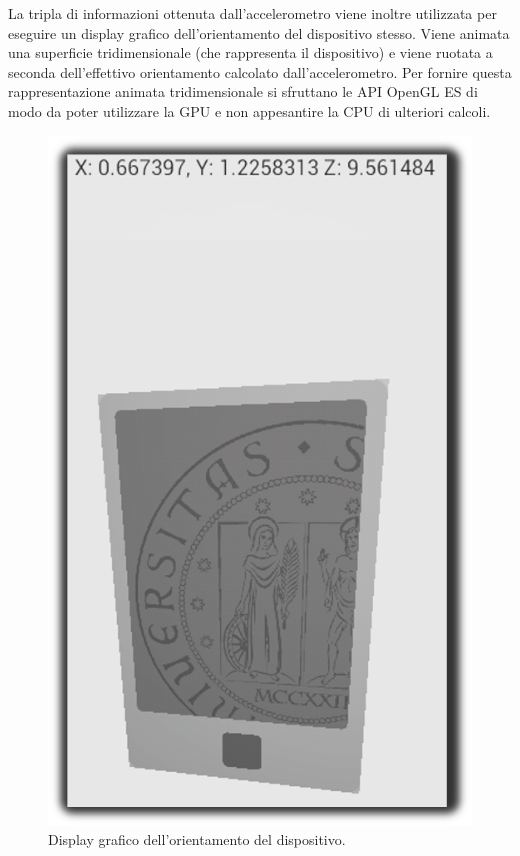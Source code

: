 La tripla di informazioni ottenuta dall'accelerometro viene inoltre utilizzata per eseguire un display grafico dell'orientamento del dispositivo stesso. Viene animata una superficie tridimensionale (che rappresenta il dispositivo) e viene ruotata a seconda dell'effettivo orientamento calcolato dall'accelerometro. Per fornire questa rappresentazione animata tridimensionale si sfruttano le API OpenGL ES di modo da poter utilizzare la GPU e non appesantire la CPU di ulteriori calcoli.
\begin{figure}[!ht]
\begin{center}
\includegraphics[scale=.3]{./../wireless/resources/opengl.png}
\caption{Display grafico dell'orientamento del dispositivo.}
\label{fig:OpenGL}
\end{center}
\end{figure}
